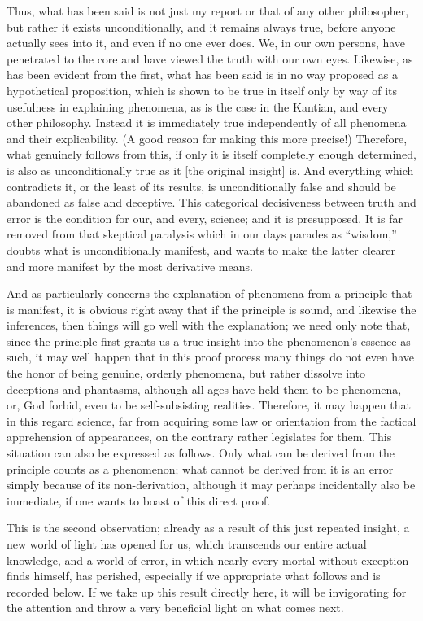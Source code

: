 Thus, what has been said is not just my report
or that of any other philosopher,
but rather it exists unconditionally,
and it remains always true,
before anyone actually sees into it,
and even if no one ever does.
We, in our own persons, have penetrated to the core
and have viewed the truth with our own eyes.
Likewise, as has been evident from the first,
what has been said is in no way proposed
as a hypothetical proposition,
which is shown to be true in itself
only by way of its usefulness in explaining phenomena,
as is the case in the Kantian, and every other philosophy.
Instead it is immediately true independently of
all phenomena and their explicability.
(A good reason for making this more precise!)
Therefore, what genuinely follows from this,
if only it is itself completely enough determined,
is also as unconditionally true as it [the original insight] is.
And everything which contradicts it,
or the least of its results, is unconditionally false
and should be abandoned as false and deceptive.
This categorical decisiveness between truth and error
is the condition for our, and every, science;
and it is presupposed.
It is far removed from that skeptical paralysis
which in our days parades as “wisdom,”
doubts what is unconditionally manifest,
and wants to make the latter clearer
and more manifest by the most derivative means.

And as particularly concerns the explanation
of phenomena from a principle that is manifest,
it is obvious right away that if the principle is sound,
and likewise the inferences,
then things will go well with the explanation;
we need only note that,
since the principle first grants us a true insight
into the phenomenon's essence as such,
it may well happen that in this proof process
many things do not even have the honor
of being genuine, orderly phenomena,
but rather dissolve into deceptions and phantasms,
although all ages have held them to be phenomena,
or, God forbid, even to be self-subsisting realities.
Therefore, it may happen that in this regard science,
far from acquiring some law or orientation
from the factical apprehension of appearances,
on the contrary rather legislates for them.
This situation can also be expressed as follows.
Only what can be derived from the principle
counts as a phenomenon;
what cannot be derived from it is an error
simply because of its non-derivation,
although it may perhaps incidentally also be immediate,
if one wants to boast of this direct proof.

This is the second observation;
already as a result of this just repeated insight,
a new world of light has opened for us,
which transcends our entire actual knowledge,
and a world of error,
in which nearly every mortal
without exception finds himself,
has perished,
especially if we appropriate
what follows and is recorded below.
If we take up this result directly here,
it will be invigorating for the attention
and throw a very beneficial light
on what comes next.

